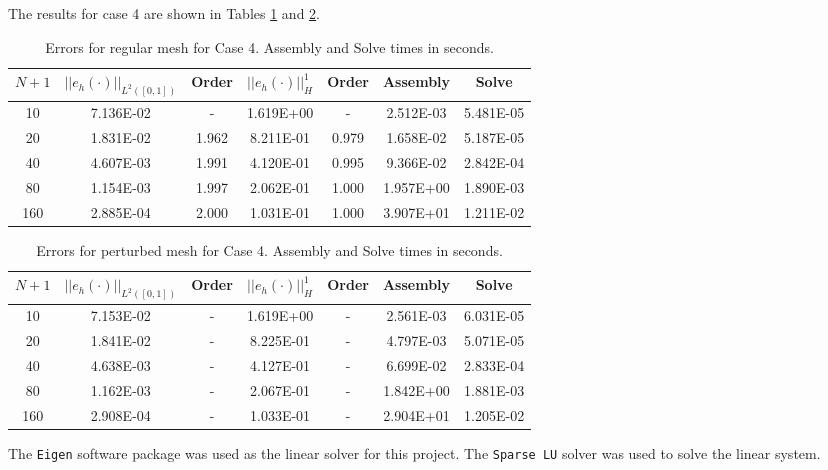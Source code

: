 \documentclass[a4paper, 12pt]{article}
\begin{document}
The results for case 4 are shown in Tables \ref{tab:C4o}
and \ref{tab:C4p}. 

\begin{table}[!ht]
\caption{Errors for regular mesh for Case 4. Assembly and Solve times in seconds.}
\vspace{0.1in}
\centering
\begin{tabular}{|c|c|c|c|c|c|c|}
\hline
 $N+1$&  $||e_h(\cdot)||_{L^2([0,1])}$ & Order & $||e_h(\cdot)||_H^1$ & Order & Assembly & Solve \\
 \hline
     10   & 7.136E-02 &  -      & 1.619E+00 &  -     & 2.512E-03 & 5.481E-05 \\
     20   & 1.831E-02 &  1.962  & 8.211E-01 &  0.979 & 1.658E-02 & 5.187E-05 \\
     40   & 4.607E-03 &  1.991  & 4.120E-01 &  0.995 & 9.366E-02 & 2.842E-04 \\
     80   & 1.154E-03 &  1.997  & 2.062E-01 &  1.000 & 1.957E+00 & 1.890E-03 \\
     160  & 2.885E-04 &  2.000  & 1.031E-01 &  1.000 & 3.907E+01 & 1.211E-02 \\
\hline
\end{tabular}
\label{tab:C4o}
\end{table}

\begin{table}[!ht]
\caption{Errors for perturbed mesh for Case 4. Assembly and Solve times in seconds.}
\vspace{0.1in}
\centering
\begin{tabular}{|c|c|c|c|c|c|c|}
\hline
 $N+1$&  $||e_h(\cdot)||_{L^2([0,1])}$ & Order & $||e_h(\cdot)||_H^1$ & Order & Assembly & Solve \\
 \hline
     10   & 7.153E-02 &  -  & 1.619E+00 &  -  & 2.561E-03 & 6.031E-05 \\
     20   & 1.841E-02 &  -  & 8.225E-01 &  -  & 4.797E-03 & 5.071E-05 \\
     40   & 4.638E-03 &  -  & 4.127E-01 &  -  & 6.699E-02 & 2.833E-04 \\
     80   & 1.162E-03 &  -  & 2.067E-01 &  -  & 1.842E+00 & 1.881E-03 \\
     160  & 2.908E-04 &  -  & 1.033E-01 &  -  & 2.904E+01 & 1.205E-02 \\
\hline
\end{tabular}
\label{tab:C4p}
\end{table}


The \texttt{Eigen} software package
was used as the linear solver for this project. 
The \texttt{Sparse LU} solver was used to 
solve the linear system.
\end{document}
